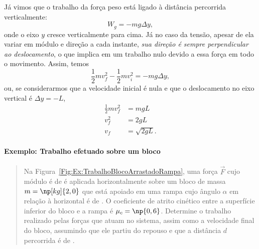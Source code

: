 Já vimos que o trabalho da força peso está ligado à distância percorrida verticalmente:
\begin{equation*}
    W_g = -mg\Delta y,
\end{equation*}
%
onde o eixo $y$ cresce verticalmente para cima. Já no caso da tensão, apesar de ela variar em módulo e direção a cada instante, \emph{sua direção é sempre perpendicular ao deslocamento}, o que implica em um trabalho nulo devido a essa força em todo o movimento. Assim, temos
\begin{equation}
    \frac{1}{2}m v_f^2 - \frac{1}{2}m v_i^2 = -mg\Delta y,
\end{equation}
%
ou, se considerarmos que a velocidade inicial é nula e que o deslocamento no eixo vertical é $\Delta y = - L$,
\begin{align}
    \frac{1}{2} m v_f^2 &= mgL \\
    v_f^2 &= 2gL \\
    v_f &= \sqrt{2gL}.
\end{align}

\paragraph{Exemplo: Trabalho efetuado sobre um bloco}

\begin{quote}
    Na Figura~\ref{Fig:Ex:TrabalhoBlocoArrastadoRampa}, uma força $\vec{F}$ cujo módulo é de  é aplicada horizontalmente sobre um bloco de massa $m = \np[kg]{2,0}$ que está apoiado em uma rampa cujo ângulo $\alpha$ em relação à horizontal é de . O coeficiente de atrito cinético entre a superfície inferior do bloco e a rampa é $\mu_c = \np{0,6}$. Determine o trabalho realizado pelas forças que atuam no sistema, assim como a velocidade final do bloco, assumindo que ele partiu do repouso e que a distância $d$ percorrida é de .
\end{quote}

